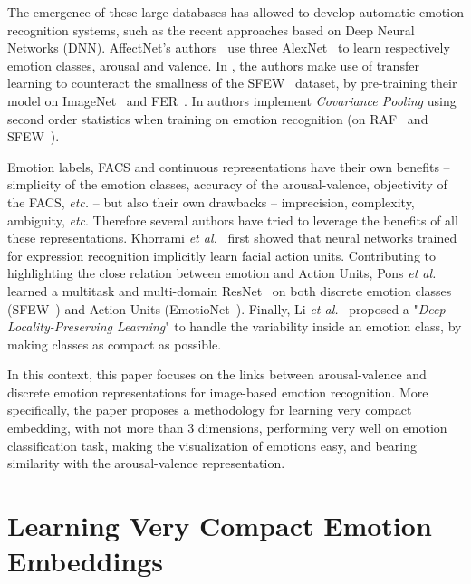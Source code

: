 \documentclass{bmvc2k}
\begin{document}
The emergence of these large databases has allowed to develop automatic emotion recognition systems, such as the recent approaches based on Deep Neural Networks (DNN). AffectNet's authors~\cite{mollahosseini_affectnet:_2017} use three AlexNet~\cite{krizhevsky_imagenet_2017} to learn respectively emotion classes, arousal and valence. In \cite{ng_deep_2015}, the authors make use of transfer learning to counteract the smallness of the SFEW~\cite{dhall_static_2011} dataset, by pre-training their model on ImageNet~\cite{deng_imagenet:_2009} and FER~\cite{goodfellow_challenges_2013}. In \cite{acharya_covariance_2018} authors implement {\em Covariance Pooling} using second order statistics when training on emotion recognition (on RAF~\cite{li_reliable_2017} and SFEW~\cite{dhall_static_2011}). 

Emotion labels, FACS and continuous representations have their own benefits -- simplicity of the emotion classes, accuracy of the arousal-valence, objectivity of the FACS, \textit{etc.} -- but also their own drawbacks --  imprecision, complexity, ambiguity, \textit{etc}. 
Therefore several authors have tried to leverage the benefits of all these representations. Khorrami \textit{et al.}~\cite{khorrami_deep_2015} first showed that neural networks trained for expression recognition implicitly learn facial action units.
Contributing to highlighting the close relation between emotion and Action Units, Pons \textit{et al.}~\cite{pons_multi-task_2018} learned a multitask and multi-domain ResNet~\cite{he_deep_2015} on both discrete emotion classes (SFEW~\cite{dhall_static_2011}) and Action Units (EmotioNet~\cite{benitez-quiroz_emotionet:_2016}). 
Finally, Li \textit{et al.}~\cite{li_reliable_2017} proposed a "\textit{Deep Locality-Preserving Learning}" to handle the variability inside an emotion class, by making classes as compact as possible. 

In this context, this paper focuses on the links between arousal-valence and discrete emotion representations for image-based emotion recognition. More specifically, the paper proposes a methodology for learning very compact embedding, with not more than 3 dimensions, performing very well on emotion classification task, making the visualization of emotions easy, and bearing similarity with the arousal-valence representation. 

 \section{Learning Very Compact Emotion Embeddings}
\label{methods}
\end{document}
